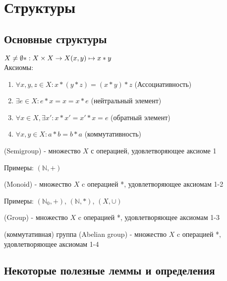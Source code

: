\documentclass[a4paper, 14pt]{article}
\begin{document}
    \section{Структуры}
    \subsection*{Основные структуры}
    $X \neq \emptyset \\
    *: X \times X \rightarrow X \\
    (x,y) \mapsto x * y$ \\

    Аксиомы:
    \begin{enumerate}
        \item $\forall x,y,z \in X: x * (y * z) = (x * y) * z$ (Ассоциативность)
        \item $\exists e \in X: e * x = x = x * e$ (нейтральный элемент)
        \item $\forall x \in X, \exists x': x * x' = x' * x = e$ (обратный элемент)
        \item $\forall x,y \in X: a * b = b * a$ (коммутативность)
    \end{enumerate}
    
    \begin{definition}
        { (Semigroup)} - множество $X$ с операцией, удовлетворяющее аксиоме 1
    \end{definition}
    Примеры: $(\mathbb{N}, +)$
    \begin{definition}
        { (Monoid)} - множество $X$ c операцией *, удовлетворяющее аксиомам 1-2
    \end{definition}
    Примеры: $(\mathbb{N}_0, +)$, $(\mathbb{N}, *)$, $(X, \cup)$
    
    \begin{definition}
        { (Group)} - множество $X$ c операцией *, удовлетворяющее аксиомам 1-3
    \end{definition}

    \begin{definition}
        { (коммутативная) группа (Abelian group)} - множество $X$ c операцией *, удовлетворяющее аксиомам 1-4
    \end{definition}

    \subsection*{Некоторые полезные леммы и определения}
\end{document}
